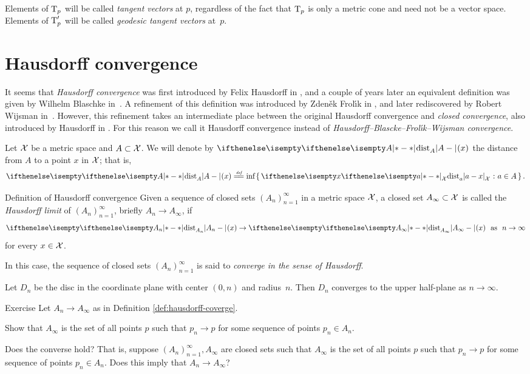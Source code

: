 Elements of $\text{\rm T}_p$ will be called 
\emph{tangent vectors} 
at $p$, regardless of the fact that $\text{\rm T}_p$ is only a metric cone and need not be a vector space.
Elements of $\text{\rm T}'_p$ will be called 
\emph{geodesic tangent vectors} 
at~$p$.

\section{Hausdorff convergence}

It seems that \emph{Hausdorff convergence} was first introduced by Felix Hausdorff in \cite{hausdorff},
and a couple of years later an equivalent definition was given by Wilhelm Blaschke in~\cite{blaschke}.
A refinement of this definition was introduced by  Zden\v{e}k Frol\'{\i}k in \cite{frolik},
and later rediscovered by Robert Wijsman in~\cite{wijsman}.  
However, this refinement takes an intermediate place between the original Hausdorff convergence and {}\emph{closed convergence}, also introduced by Hausdorff in \cite{hausdorff}.
For this reason we call it Hausdorff convergence
instead of
{}\emph{Hausdorff--Blascke--Frol\'{\i}k--Wijsman convergence}.


Let $\mathcal{X}$ be a metric space and $A\subset \spc{X}$.
We will denote by $\dist{A}{}{}(x)$ the distance from $A$ to a point $x$ in $\mathcal{X}$;
that is,
$$\dist{A}{}{}(x)\df\inf\set{\dist{a}{x}{\spc{X}}}{a\in A}.$$

\begin{thm}{Definition of Hausdorff convergence}\label{def:hausdorff-coverge}
Given a sequence of closed sets $(A_n)_{n=1}^\infty$ in a metric space $\mathcal{X}$, 
a closed set $A_\infty\subset \spc{X}$ is called the \emph{Hausdorff limit} of $(A_n)_{n=1}^\infty$,
briefly $A_n\to A_\infty$, if 
$$\dist{A_n}{}{}(x)\to\dist{A_\infty}{}{}(x)\ \ \t{as}\ \ n\to\infty$$
for every $x\in \spc{X}$.

In this case, the sequence of closed sets $(A_n)_{n=1}^\infty$ is said to \emph{converge in the sense of Hausdorff}.
\end{thm}

Let $D_n$ be the disc in the coordinate plane 
with center $(0,n)$ and radius~$n$.
Then $D_n$ converges to the upper half-plane as $n\to\infty$. 

\begin{thm}{Exercise}\label{ex:hausdorff-conv}
Let $A_n\to A_\infty$ as in Definition \ref{def:hausdorff-coverge}.  

Show that $A_\infty$ is the set of all points $p$ such that   $p_n\to p$ for some sequence of points  $p_n\in A_n$.

Does  the converse hold? That is, suppose $(A_n)_{n=1}^\infty, A_\infty$ are closed sets such that  $A_\infty$  is the set of all points $p$ such that   $p_n\to p$ for some sequence of points  $p_n\in A_n$.
Does this imply that $A_n\to A_\infty$?
\end{thm}


